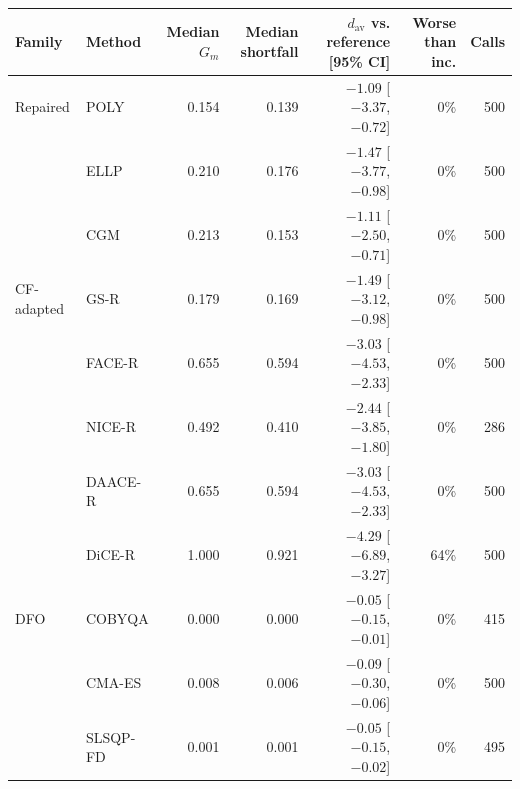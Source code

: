 \begin{tabular}{@{}llrrrrr@{}}
\toprule
Family & Method & Median $G_m$ & Median shortfall & $d_{\mathrm{av}}$ vs. reference [95\% CI] & Worse than inc. & Calls \\
\midrule
Repaired & POLY & 0.154 & 0.139 & $-1.09$ [$-3.37$, $-0.72$] & 0\% & 500 \\
 & ELLP & 0.210 & 0.176 & $-1.47$ [$-3.77$, $-0.98$] & 0\% & 500 \\
 & CGM & 0.213 & 0.153 & $-1.11$ [$-2.50$, $-0.71$] & 0\% & 500 \\
\addlinespace
CF-adapted & GS-R & 0.179 & 0.169 & $-1.49$ [$-3.12$, $-0.98$] & 0\% & 500 \\
 & FACE-R & 0.655 & 0.594 & $-3.03$ [$-4.53$, $-2.33$] & 0\% & 500 \\
 & NICE-R & 0.492 & 0.410 & $-2.44$ [$-3.85$, $-1.80$] & 0\% & 286 \\
 & DAACE-R & 0.655 & 0.594 & $-3.03$ [$-4.53$, $-2.33$] & 0\% & 500 \\
 & DiCE-R & 1.000 & 0.921 & $-4.29$ [$-6.89$, $-3.27$] & 64\% & 500 \\
\addlinespace
DFO & COBYQA & 0.000 & 0.000 & $-0.05$ [$-0.15$, $-0.01$] & 0\% & 415 \\
 & CMA-ES & 0.008 & 0.006 & $-0.09$ [$-0.30$, $-0.06$] & 0\% & 500 \\
 & SLSQP-FD & 0.001 & 0.001 & $-0.05$ [$-0.15$, $-0.02$] & 0\% & 495 \\
\bottomrule
\end{tabular}
